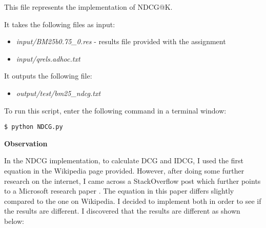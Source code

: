 \documentclass{article} %
\begin{document}
This file represents the implementation of NDCG@K.

It takes the following files as input:

\begin{itemize}
    \item \textit{input/BM25b0.75\_0.res} - results file provided with the assignment
    \item \textit{input/qrels.adhoc.txt}
\end{itemize}

It outputs the following file:

\begin{itemize}
    \item \textit{output/test/bm25\_ndcg.txt}
\end{itemize}

To run this script, enter the following command in a terminal window:

\begin{lstlisting}[style=Bash]
  $ python NDCG.py
\end{lstlisting}

\textbf{Observation}

In the NDCG implementation, to calculate DCG and IDCG, I used the first equation in the Wikipedia \cite{discountedcumulativegain} page provided. However, after doing some further research on the internet, I came across a StackOverflow post \cite{stackoverflow} which further points to a Microsoft research paper \cite{sakai2014metrics}. The equation in this paper differs slightly compared to the one on Wikipedia. I decided to implement both in order to see if the results are different. I discovered that the results are different as shown below:
\end{document}
